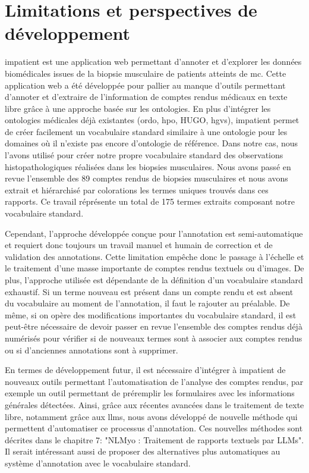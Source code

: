 \section{Limitations et perspectives de développement}
\gls{impatient} est une application web permettant d'annoter et d'explorer les données biomédicales issues de la biopsie musculaire de patients atteints de \gls{mc}. Cette application web a été développée pour pallier au manque d'outils permettant d'annoter et d'extraire de l'information de comptes rendus médicaux en texte libre grâce à une approche basée sur les ontologies. En plus d'intégrer les ontologies médicales déjà existantes (\gls{ordo}, \gls{hpo}, HUGO, \gls{hgvs}), \gls{impatient} permet de créer facilement un vocabulaire standard similaire à une ontologie pour les domaines où il n'existe pas encore d'ontologie de référence. Dans notre cas, nous l'avons utilisé pour créer notre propre vocabulaire standard des observations histopathologiques réalisées dans les biopsies musculaires. Nous avons passé en revue l'ensemble des 89 comptes rendus de biopsies musculaires et nous avons extrait et hiérarchisé par colorations les termes uniques trouvés dans ces rapports. Ce travail réprésente un total de 175 termes extraits composant notre vocabulaire standard.


Cependant, l'approche développée conçue pour l'annotation est semi-automatique et requiert donc toujours un travail manuel et humain de correction et de validation des annotations. Cette limitation empêche donc le passage à l'échelle et le traitement d'une masse importante de comptes rendus textuels ou d'images. De plus, l'approche utilisée est dépendante de la définition d'un vocabulaire standard exhaustif. Si un terme nouveau est présent dans un compte rendu et est absent du vocabulaire au moment de l'annotation, il faut le rajouter au préalable. De même, si on opère des modifications importantes du vocabulaire standard, il est peut-être nécessaire de devoir passer en revue l'ensemble des comptes rendus déjà numérisés pour vérifier si de nouveaux termes sont à associer aux comptes rendus ou si d'anciennes annotations sont à supprimer.


En termes de développement futur, il est nécessaire d'intégrer à \gls{impatient} de nouveaux outils permettant l'automatisation de l'analyse des comptes rendus, par exemple un outil permettant de préremplir les formulaires avec les informations générales détectées. Ainsi, grâce aux récentes avancées dans le traitement de texte libre, notamment grâce aux \gls{llms}, nous avons développé de nouvelle méthode qui permettent d'automatiser ce processus d'annotation. Ces nouvelles méthodes sont décrites dans le chapitre 7: "NLMyo : Traitement de rapports textuels par LLMs". Il serait intéressant aussi de proposer des alternatives plus automatiques au système d'annotation avec le vocabulaire standard.


